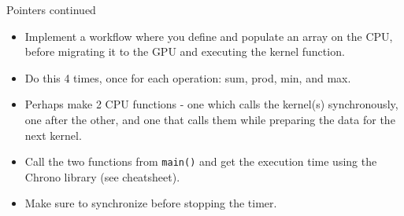 \documentclass[11pt,t]{beamer}
\newcommand{\inline}[1]{ \colorbox{mygray}{\lstinline{#1}}}
\begin{document}
\begin{frame}[fragile]{Pointers continued}

\begin{itemize}\setlength\itemsep{0.75em}
    \item Implement a workflow where you define and populate an array on the CPU, before migrating it to the GPU and executing the kernel function.
    \item Do this 4 times, once for each operation: sum, prod, min, and max.
    \item Perhaps make 2 CPU functions - one which calls the kernel(s) synchronously, one after the other, and one that calls them while preparing the data for the next kernel.
    \item Call the two functions from \inline{main()} and get the execution time using the Chrono library (see cheatsheet).
    \item Make sure to synchronize before stopping the timer.
\end{itemize}

\end{frame}
\end{document}
